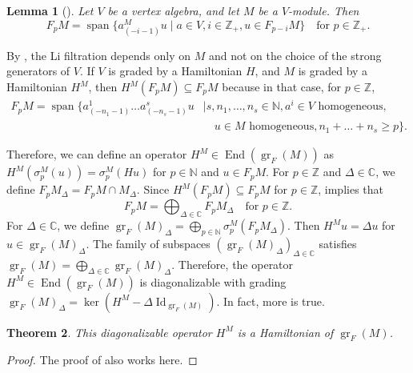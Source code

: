 \documentclass[a4paper, 12pt, reqno]{amsart}
\newtheorem{theorem}{Theorem}[section]
\newtheorem{lemma}[theorem]{Lemma}
\theoremstyle{remark}
\numberwithin{equation}{subsection}
\DeclareMathOperator{\Id}{Id}
\DeclareMathOperator{\gr}{gr}
\DeclareMathOperator{\End}{End}
\DeclareMathOperator{\vspan}{span}
\begin{document}
\begin{lemma}[{\cite[Lemma 2.9]{li_abelianizing_2005}}]
  \label{lmm:24}
  Let $V$ be a vertex algebra, and let $M$ be a $V$-module.
  Then
  \begin{equation*}
    F_pM = \vspan\{a^M_{(-i - 1)}u \mid a \in V, i \in \mathbb{Z}_+, u \in F_{p - i}M\} \quad \text{for }p \in \mathbb{Z}_+.
  \end{equation*}
\end{lemma}

By , the Li filtration depends only on $M$ and not on the choice of the strong generators of $V$.
If $V$ is graded by a Hamiltonian $H$, and $M$ is graded by a Hamiltonian $H^M$, then $H^M(F_pM) \subseteq F_pM$ because in that case, for $p \in \mathbb{Z}$,
\begin{equation*}
  \begin{split}
    F_pM = \vspan\{a^1_{(-n_1 - 1)}\dots a^s_{(-n_s - 1)}u &\mid s, n_1, \dots, n_s \in \mathbb{N}, a^i \in V\text{ homogeneous}, \\
    &\quad u \in M\text{ homogeneous}, n_1 + \dots + n_s \ge p\}.
  \end{split}
\end{equation*}

Therefore, we can define an operator $H^M \in \End(\gr_F(M))$ as $H^M(\sigma^M_p(u)) = \sigma^M_p(Hu)$ for $p \in \mathbb{N}$ and $u \in F_pM$.
For $p \in \mathbb{Z}$ and $\Delta \in \mathbb{C}$, we define $F_pM_{\Delta} = F_pM \cap M_{\Delta}$.
Since $H^M(F_pM) \subseteq F_pM$ for $p \in \mathbb{Z}$,  implies that
\begin{equation*}
  F_pM = \bigoplus_{\Delta \in \mathbb{C}}F_pM_{\Delta} \quad \text{for }p \in \mathbb{Z}.
\end{equation*}
For $\Delta \in \mathbb{C}$, we define $\gr_F(M)_{\Delta} = \bigoplus_{p \in \mathbb{N}}\sigma^M_p(F_pM_{\Delta})$.
Then $H^Mu = \Delta u$ for $u \in \gr_F(M)_{\Delta}$.
The family of subspaces $(\gr_F(M)_{\Delta})_{\Delta \in \mathbb{C}}$ satisfies $\gr_F(M) = \bigoplus_{\Delta \in \mathbb{C}}\gr_F(M)_{\Delta}$.
Therefore, the operator $H^M \in \End(\gr_F(M))$ is diagonalizable with grading $\gr_F(M)_{\Delta} = \ker(H^M - \Delta\Id_{\gr_F(M)})$.
In fact, more is true.

\begin{theorem}
  \label{thr:50}
  This diagonalizable operator $H^M$ is a Hamiltonian of $\gr_F(M)$.
\end{theorem}

\begin{proof}
  The proof of  also works here.
\end{proof}
\end{document}
